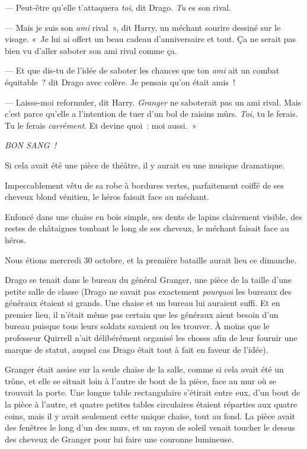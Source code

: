 --- Peut-être qu'elle t'attaquera \emph{toi}, dit Drago. \emph{Tu} es son rival.

--- Mais je suis son \emph{ami} rival~», dit Harry, un méchant sourire dessiné sur le visage. «~Je lui ai offert un beau cadeau d'anniversaire et tout. Ça ne serait pas bien vu d'aller saboter son ami rival comme ça.

--- Et que dis-tu de l'idée de saboter les chances que ton \emph{ami} ait un combat équitable~? dit Drago avec colère. Je pensais qu'on était amis~!

--- Laisse-moi reformuler, dit Harry. \emph{Granger} ne saboterait pas un ami rival. Mais c'est parce qu'elle a l'intention de tuer d'un bol de raisins mûrs. \emph{Toi}, tu le ferais. Tu le ferais \emph{carrément}. Et devine quoi~: moi aussi.~»

\emph{BON SANG~!}

\later

Si cela avait été une pièce de théâtre, il y aurait eu une musique dramatique.

Impeccablement vêtu de sa robe à bordures vertes, parfaitement coiffé de ses cheveux blond vénitien, le héros faisait face au méchant.

Enfoncé dans une chaise en bois simple, ses dents de lapins clairement visible, des restes de châtaignes tombant le long de ses cheveux, le méchant faisait face au héros.

Nous étions mercredi 30 octobre, et la première bataille aurait lieu ce dimanche.

Drago se tenait dans le bureau du général Granger, une pièce de la taille d'une petite salle de classe (Drago ne savait pas exactement \emph{pourquoi} les bureaux des généraux étaient si grands. Une chaise et un bureau lui auraient suffi. Et en premier lieu, il n'était même pas certain que les généraux aient besoin d'un bureau puisque tous leurs soldats savaient ou les trouver. À moins que le professeur Quirrell n'ait délibérément organisé les choses afin de leur fournir une marque de statut, auquel cas Drago était tout à fait en faveur de l'idée).

Granger était assise sur la seule chaise de la salle, comme si cela avait été un trône, et elle se situait loin à l'autre de bout de la pièce, face au mur où se trouvait la porte. Une longue table rectangulaire s'étirait entre eux, d'un bout de la pièce à l'autre, et quatre petites tables circulaires étaient réparties aux quatre coins, mais il y avait seulement cette unique chaise, tout au fond. La pièce avait des fenêtres le long d'un des murs, et un rayon de soleil venait toucher le dessus des cheveux de Granger pour lui faire une couronne lumineuse.

